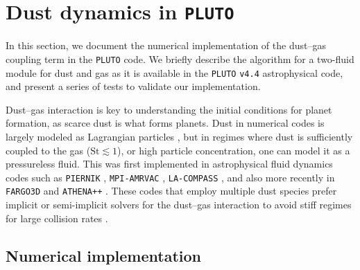 \documentclass[fleqn,usenatbib,useAMS]{mnras}
\newcommand{\St}{\mathrm{St}}
\newcommand{\pluto}{\texttt{PLUTO}}
\begin{document}

\appendix

\section{Dust dynamics in \pluto{}}
\label{apdx:dust-pluto}

In this section, we document the numerical implementation of the dust--gas coupling term in the \pluto{} code. We briefly describe the algorithm for a two-fluid module for dust and gas as it is available in the \pluto{} \texttt{v4.4} astrophysical code, and present a series of tests to validate our implementation.

Dust--gas interaction is key to understanding the initial conditions for planet formation, as scarce dust is what forms planets. Dust in numerical codes is largely modeled as Lagrangian particles \citep[e.g.,][]{bai-stone-2010,yang-johansen-2016,price-etal-2018,mignone-2019}, but in regimes where dust is sufficiently coupled to the gas ($\St\lesssim 1$), or high particle concentration, one can model it as a pressureless fluid. This was first implemented in astrophysical fluid dynamics codes such as \texttt{PIERNIK} \citep{kowalik-etal-2013}, \texttt{MPI-AMRVAC} \citep{porth-etal-2014}, \texttt{LA-COMPASS} \citep{fu-etal-2014}, and also more recently in \texttt{FARGO3D} \citep{benitez-etal-2019} and \texttt{ATHENA++} \citep{huang-bai-2022}. These codes that employ multiple dust species prefer implicit or semi-implicit solvers for the dust--gas interaction to avoid stiff regimes for large collision rates \citep{stoyanovskaya-etal-2018}.

\subsection{Numerical implementation}
\label{sub:dust-implementation}
\end{document}
